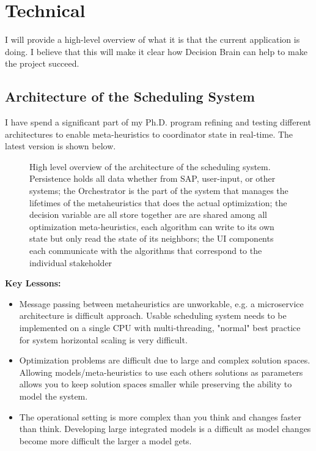 \newpage
\section*{Technical}
\label{sec:technical}

I will provide a high-level overview of what it is that the current application is doing. I believe that 
this will make it clear how Decision Brain can help to make the project succeed.


\subsection*{Architecture of the Scheduling System}
I have spend a significant part of my Ph.D. program refining and testing different architectures to enable
meta-heuristics to coordinator state in real-time. The latest version is shown below.

\begin{figure}[H]
	\centering
	

	\caption{
		High level overview of the architecture of the scheduling system. Persistence holds
		all data whether from SAP, user-input, or other systems; the Orchestrator is the part of the 
		system that manages the lifetimes of the metaheuristics that does the actual optimization;
		the decision variable are all store together are are shared among all optimization meta-heuristics, 
		each algorithm can write to its own state but only read the state of its neighbors; the UI components
		each communicate with the algorithms that correspond to the individual stakeholder
	}

\end{figure}

\textbf{Key Lessons:}
\begin{itemize}
	\item Message passing between metaheuristics are unworkable, e.g. a microservice architecture is difficult approach. Usable scheduling
	      system needs to be implemented on a single CPU with multi-threading, "normal" best practice for system horizontal scaling is very difficult. 
	\item Optimization problems are difficult due to large and complex solution spaces. Allowing models/meta-heuristics
			  to use each others solutions as parameters allows you to keep solution spaces smaller while preserving the 
		  ability to model the system. 
	\item The operational setting is more complex than you think and changes faster than think. Developing large integrated models 
		  is a difficult as model changes become more difficult the larger a model gets.
\end{itemize}

